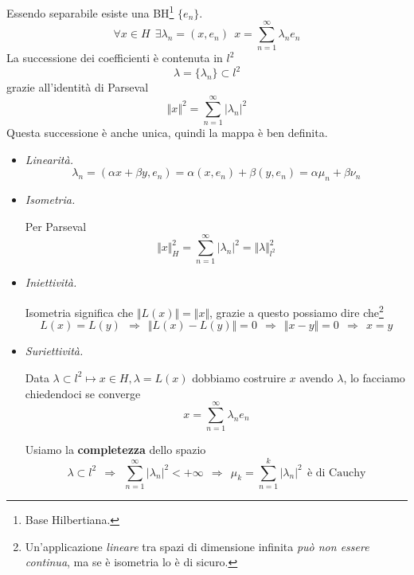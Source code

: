 Essendo separabile esiste una BH\footnote{Base Hilbertiana.} $\{e_{n}\}$.
\begin{equation*}
\forall x\in H\ \ \exists \lambda _{n} =( x,e_{n}) \ \ x=\sum ^{\infty }_{n=1} \lambda _{n} e_{n}
\end{equation*}
La successione dei coefficienti è contenuta in $l^{2}$
\begin{equation*}
\lambda =\{\lambda _{n}\} \subset l^{2}
\end{equation*}
grazie all'identità di Parseval
\begin{equation*}
\Vert x\Vert ^{2} =\sum\limits ^{\infty }_{n=1}| \lambda _{n}| ^{2}
\end{equation*}
Questa successione è anche unica, quindi la mappa è ben definita.
\begin{itemize}
\item \textit{Linearità.}\begin{equation*}
\lambda _{n} =( \alpha x+\beta y,e_{n}) =\alpha ( x,e_{n}) +\beta ( y,e_{n}) =\alpha \mu _{n} +\beta \nu _{n}
\end{equation*}
\item \textit{Isometria.}

Per Parseval\begin{equation*}
\Vert x\Vert ^{2}_{H} =\sum ^{\infty }_{n=1}| \lambda _{n}| ^{2} =\Vert \lambda \Vert ^{2}_{l^{2}}
\end{equation*}
\item \textit{Iniettività.}

Isometria significa che $\Vert L( x)\Vert =\Vert x\Vert $, grazie a questo possiamo dire che\footnote{Un'applicazione \textit{lineare} tra spazi di dimensione infinita \textit{può non essere continua}, ma se è isometria lo è di sicuro.}\begin{equation*}
L( x) =L( y) \ \ \Rightarrow \ \ \Vert L( x) -L( y)\Vert =0\ \ \Rightarrow \ \ \Vert x-y\Vert =0\ \ \Rightarrow \ \ x=y
\end{equation*}
\item \textit{Suriettività.}

Data $\lambda \subset l^{2} \mapsto x\in H,\lambda =L( x)$ dobbiamo costruire $x$ avendo $\lambda $, lo facciamo chiedendoci se converge\begin{equation*}
x=\sum ^{\infty }_{n=1} \lambda _{n} e_{n}
\end{equation*}

Usiamo la \textbf{completezza} dello spazio\begin{equation*}
\lambda \subset l^{2} \ \ \Rightarrow \ \ \sum\limits ^{\infty }_{n=1}| \lambda _{n}| ^{2} < +\infty \ \ \Rightarrow \ \ \mu _{k} =\sum\limits ^{k}_{n=1}| \lambda _{n}| ^{2} \ \ \text{è di Cauchy}
\end{equation*}


\end{itemize}
